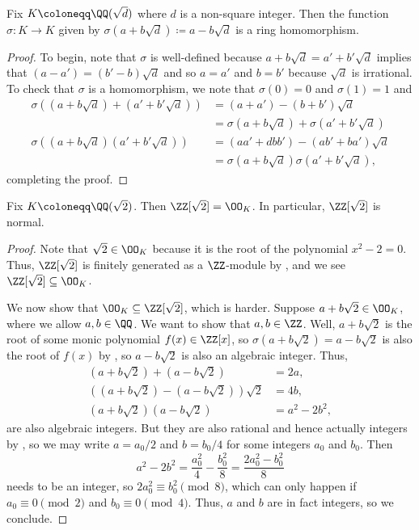 \documentclass[../notes.tex]{subfiles}
\begin{document}
\begin{lemma} \label{lem:quadratic-conjugation}
	Fix $K\coloneqq\QQ(\sqrt d)$ where $d$ is a non-square integer. Then the function $\sigma\colon K\to K$ given by $\sigma\left(a+b\sqrt d\right)\coloneqq a-b\sqrt d$ is a ring homomorphism.
\end{lemma}
\begin{proof}
	To begin, note that $\sigma$ is well-defined because $a+b\sqrt d=a'+b'\sqrt d$ implies that $(a-a')=(b'-b)\sqrt d$ and so $a=a'$ and $b=b'$ because $\sqrt d$ is irrational. To check that $\sigma$ is a homomorphism, we note that $\sigma(0)=0$ and $\sigma(1)=1$ and
	\begin{align*}
		\sigma\left((a+b\sqrt d)+(a'+b'\sqrt d)\right) &= (a+a')-(b+b')\sqrt d \\
		&= \sigma(a+b\sqrt d)+\sigma(a'+b'\sqrt d) \\
		\sigma\left((a+b\sqrt d)(a'+b'\sqrt d)\right) &= (aa'+dbb')-(ab'+ba')\sqrt d \\
		&= \sigma\left(a+b\sqrt d\right)\sigma\left(a'+b'\sqrt d\right),
	\end{align*}
	completing the proof.
\end{proof}
\begin{example}
	Fix $K\coloneqq\QQ(\sqrt2)$. Then $\ZZ[\sqrt2]=\OO_K$. In particular, $\ZZ[\sqrt2]$ is normal.
\end{example}
\begin{proof}
	Note that $\sqrt2\in\OO_K$ because it is the root of the polynomial $x^2-2=0$. Thus, $\ZZ[\sqrt2]$ is finitely generated as a $\ZZ$-module by , and we see $\ZZ[\sqrt2]\subseteq\OO_K$.

	We now show that $\OO_K\subseteq\ZZ[\sqrt2]$, which is harder. Suppose $a+b\sqrt 2\in\OO_K$, where we allow $a,b\in\QQ$. We want to show that $a,b\in\ZZ$. Well, $a+b\sqrt2$ is the root of some monic polynomial $f(x)\in\ZZ[x]$, so $\sigma\left(a+b\sqrt2\right)=a-b\sqrt2$ is also the root of $f(x)$ by , so $a-b\sqrt2$ is also an algebraic integer. Thus,
	\begin{align*}
		(a+b\sqrt2)+(a-b\sqrt2)&=2a, \\
		\left((a+b\sqrt2)-(a-b\sqrt2)\right)\sqrt2&=4b, \\
		(a+b\sqrt2)(a-b\sqrt2)&=a^2-2b^2,
	\end{align*}
	are also algebraic integers. But they are also rational and hence actually integers by , so we may write $a=a_0/2$ and $b=b_0/4$ for some integers $a_0$ and $b_0$. Then
	\[a^2-2b^2=\frac{a_0^2}4-\frac{b_0^2}8=\frac{2a_0^2-b_0^2}8\]
	needs to be an integer, so $2a_0^2\equiv b_0^2\pmod8$, which can only happen if $a_0\equiv0\pmod2$ and $b_0\equiv0\pmod4$. Thus, $a$ and $b$ are in fact integers, so we conclude.
\end{proof}
\end{document}
